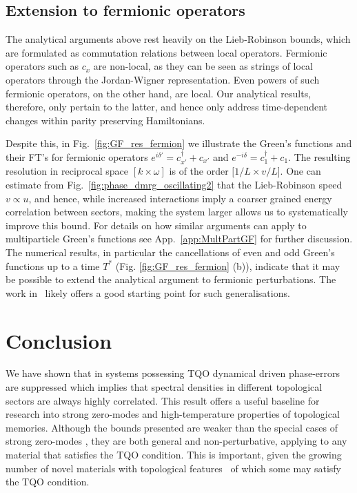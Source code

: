 \documentclass[aps,pra,floatfix,footinbib,longbibliography,twocolumn,superscriptaddress, preprintnumbers, nobibnotes]{revtex4-1}
\begin{document}
\subsection{Extension to fermionic operators} The analytical arguments above rest heavily on the Lieb-Robinson bounds, which are formulated as commutation relations between local operators. Fermionic operators such as $c_x$ are non-local, as they can be seen as strings of local operators through the Jordan-Wigner representation. Even powers of such fermionic operators, on the other hand, are local. Our analytical results, therefore, only pertain to the latter, and hence only address time-dependent changes within parity preserving Hamiltonians. 

Despite this, in Fig.~\ref{fig:GF_res_fermion} we illustrate the Green's functions and their FT's for fermionic operators $e^{i \delta'}  =  c^\dagger_{x'}+ c_{x'}$ and $e^{-i \delta}  =  c^\dagger_{1} + c_{1} $.  The resulting resolution in reciprocal space $[k \times \omega ]$ is of the order $[1/L \times v/L$].  One can estimate from Fig.~\ref{fig:phase_dmrg_oscillating2} that the Lieb-Robinson speed $v\propto u$, and hence, while increased interactions imply a coarser grained energy correlation between sectors, making the system larger allows us to systematically improve this bound.  For details on how similar arguments can apply to multiparticle Green's functions see App.~\ref{app:MultPartGF} for further discussion. The numerical results, in particular the cancellations of even and odd Green's functions up to a time $T^*$ (Fig. \ref{fig:GF_res_fermion} (b)), indicate that it may be possible to extend the analytical argument to fermionic perturbations. The work in~\cite{2017arXiv170508553N,Hastings:2005pr} likely offers a good starting point for such generalisations.  

\section{Conclusion}
We have shown that in systems possessing TQO dynamical driven phase-errors are suppressed which implies that spectral densities in different topological sectors are always highly correlated. This result offers a useful baseline for research into strong zero-modes and high-temperature properties of topological memories. Although the bounds presented are weaker than the special cases of strong zero-modes \cite{Gangadharaiah2011, Jermyn2014, Kells2015, Kells2015b, Fendley2016, Kemp2017, Moran2017, McGinley2017, Ardonne2018, Pellegrino2020, Ardonne2020}, they are both general and non-perturbative, applying to any material that satisfies the TQO condition. This is important, given the growing number of novel materials with topological features~\cite{Bradlyn2017} of which some may satisfy the TQO condition.  
\end{document}
